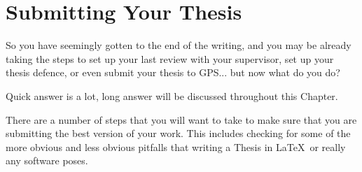 \chapter{Submitting Your Thesis}
	So you have seemingly gotten to the end of the writing, and you may be already taking the steps to set up your last review with your supervisor, set up your thesis defence, or even submit your thesis to GPS... but now what do you do?
	
	Quick answer is a lot, long answer will be discussed throughout this Chapter.
	
	There are a number of steps that you will want to take to make sure that you are submitting the best version of your work.
	This includes checking for some of the more obvious and less obvious pitfalls that writing a Thesis in \LaTeX\ or really any software poses.